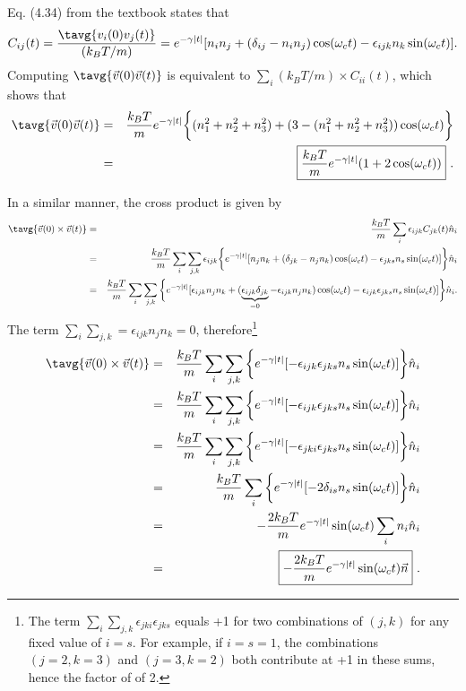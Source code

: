 
Eq. (4.34) from the textbook states that
\begin{equation}
C_{ij}(t)= \frac{\tavg{v_i(0) v_j(t)}}{(k_B T/m)} = e^{-\gamma |t|} [ n_i n_j + (\delta_{ij} - n_i n_j) \cos(\omega_c t) - \epsilon_{ijk} n_k \sin(\omega_c t)].
\end{equation}
Computing $\tavg{\vec{v}(0) \vec{v}(t)}$ is equivalent to $\sum_{i}(k_B T/m) \times C_{ii}(t)$, which shows that
\begin{eqnarray}
\tavg{\vec{v}(0) \vec{v}(t)} &=& \frac{k_B T}{m} e^{-\gamma |t|} \bigg\{ (n_1^2 + n_2^2 + n_3^2) + (3 -(n_1^2 + n_2^2 + n_3^2)) \cos(\omega_c t) \bigg\} \\
&=& \boxed{\frac{k_B T}{m} e^{-\gamma |t|} ( 1 + 2 \cos(\omega_c t))}~.
\end{eqnarray}

In a similar manner, the cross product is given by
\begin{eqnarray}
\tavg{\vec{v}(0) \times \vec{v}(t)} &=& \frac{k_B T}{m} \sum_{i} \epsilon_{ijk} C_{jk}(t) \hat{n}_i \nonumber \\
&=& \frac{k_B T}{m} \sum_{i} \sum_{j, k} \epsilon_{ijk} \bigg\{ e^{-\gamma |t|} [ n_j n_k + (\delta_{jk} - n_j n_k) \cos(\omega_c t) - \epsilon_{jks} n_s \sin(\omega_c t)]\bigg\} \hat{n}_i \nonumber \\
&=& \frac{k_B T}{m} \sum_{i} \sum_{j, k} \bigg\{ e^{-\gamma |t|} [ \epsilon_{ijk} n_j n_k + (\underbrace{\epsilon_{ijk} \delta_{jk}}_{=0} -\epsilon_{ijk} n_j n_k) \cos(\omega_c t) - \epsilon_{ijk} \epsilon_{jks} n_s \sin(\omega_c t)]\bigg\}\hat{n}_i \nonumber.
\end{eqnarray}
The term $\sum_{i} \sum_{j, k} = \epsilon_{ijk} n_j n_k = 0$, therefore\footnote{The term $\sum_{i} \sum_{j, k} \epsilon_{jki} \epsilon_{jks}$ equals +1 for two combinations of $(j, k)$ for any fixed value of $i=s$. For example, if $i=s=1$, the combinations $(j=2, k=3)$ and $(j=3, k=2)$ both contribute at +1 in these sums, hence the factor of of 2. }
\begin{eqnarray}
\tavg{\vec{v}(0) \times \vec{v}(t)} &=& \frac{k_B T}{m} \sum_{i} \sum_{j, k} \bigg\{ e^{-\gamma |t|} [-\epsilon_{ijk} \epsilon_{jks} n_s \sin(\omega_c t)]\bigg\}\hat{n}_i \nonumber \\
&=& \frac{k_B T}{m} \sum_{i} \sum_{j, k} \bigg\{ e^{-\gamma |t|} [-\epsilon_{ijk} \epsilon_{jks} n_s \sin(\omega_c t)]\bigg\}\hat{n}_i \\
&=& \frac{k_B T}{m} \sum_{i} \sum_{j, k} \bigg\{ e^{-\gamma |t|} [-\epsilon_{jki} \epsilon_{jks} n_s \sin(\omega_c t)]\bigg\}\hat{n}_i \nonumber \\
&=& \frac{k_B T}{m} \sum_{i}\bigg\{ e^{-\gamma |t|} [-2 \delta_{is} n_s \sin(\omega_c t)]\bigg\}\hat{n}_i \nonumber \\
&=& -\frac{2k_B T}{m} e^{-\gamma |t|} \sin(\omega_c t) \sum_{i} n_i \hat{n}_i \nonumber \\
&=& \boxed{-\frac{2k_B T}{m} e^{-\gamma |t|}\sin(\omega_c t) \vec{n}}~.
\end{eqnarray}